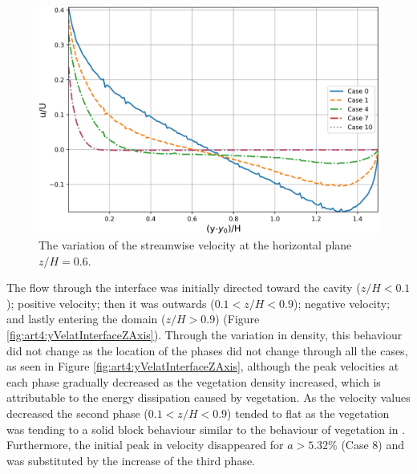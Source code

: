 \begin{figure}[!ht]
\centering
\includegraphics[width=\linewidth]{../images/art4/velXYPlane.jpg}
\caption{The variation of the streamwise velocity at the horizontal plane $z/H = 0.6$.}
\label{fig:art4:velXYPlane}
\end{figure}
The flow through the interface was initially directed toward the cavity ($z/H < 0.1$); positive velocity; then it was outwards ($0.1 < z/H < 0.9$); negative velocity; and lastly entering the domain ($z/H > 0.9$) (Figure \ref{fig:art4:yVelatInterfaceZAxis}). Through the variation in density, this behaviour did not change as the location of the phases did not change through all the cases, as seen in Figure \ref{fig:art4:yVelatInterfaceZAxis}, although the peak velocities at each phase gradually decreased as the vegetation density increased, which is attributable to the energy dissipation caused by vegetation. As the velocity values decreased the second phase ($0.1 < z/H < 0.9$) tended to flat as the vegetation was tending to a solid block behaviour similar to the behaviour of vegetation in \cite{chen2012}. Furthermore, the initial peak in velocity disappeared for $a > 5.32$\% (Case 8) and was substituted by the increase of the third phase.

